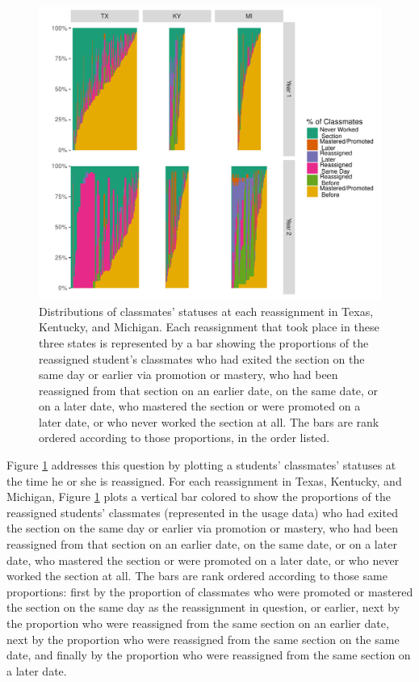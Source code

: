 \documentclass[12pt]{article}\usepackage[]{graphicx}\usepackage[]{color}
\makeatletter
\def\maxwidth{ %
  \ifdim\Gin@nat@width>\linewidth
    \linewidth
  \else
    \Gin@nat@width
  \fi
}
\makeatother
\begin{document}
\begin{figure}
  \centering


\includegraphics[width=\maxwidth]{figure/classmates-1} 

\caption{Distributions of classmates' statuses at each reassignment in
  Texas, Kentucky, and Michigan. Each reassignment that took place in
  these three states is represented by a bar showing the proportions of
  the reassigned student's classmates who had exited the section on
  the same day or earlier via promotion or mastery, who had been
  reassigned from that section on an earlier date, on the same date,
  or on a later date, who mastered the section or were promoted on a
  later date, or who never worked the section at all. The bars are
  rank ordered according to those proportions, in the order listed.}
\label{fig:classmates}
\end{figure}

Figure \ref{fig:classmates} addresses this question by plotting a
students' classmates' statuses at the time he or she is reassigned.
For each reassignment in Texas, Kentucky, and Michigan, Figure \ref{fig:classmates}
plots a vertical bar colored to show the proportions of the reassigned
students' classmates (represented in the usage data) who  had exited the section on
the same day or earlier via promotion or mastery, who had been
reassigned from that section on an earlier date, on the same date,
or on a later date, who mastered the section or were promoted on a
later date, or who never worked the section at all.
The bars are rank ordered according to those same proportions: first by the
proportion of classmates who were promoted or mastered the section on
the same day as the reassignment in question, or earlier, next by the
proportion who were reassigned from the same section on an earlier
date, next by the proportion who were reassigned from the same section
on the same date, and finally by the proportion who were reassigned
from the same section on a later date.
\end{document}
